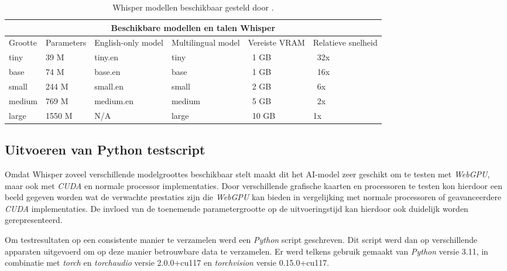 \begin{table}[b]
    \begin{tabular}{ |p{1.6cm}|p{2.5cm}|p{2.7cm}|p{2.7cm}|p{1.9cm}|p{1.8cm}|  }
        \hline
        \multicolumn{6}{|c|}{Beschikbare modellen en talen Whisper} \\
        \hline
            Grootte& Parameters & English-only model & Multilingual model & Vereiste VRAM & Relatieve snelheid\\
        \hline
            tiny&       39 M    &tiny.en    & tiny& ~1 GB& ~32x     \\
            base &      74 M	&base.en    & base & ~1 GB & ~16x   \\
            small &     244 M	&small.en   & small & ~2 GB & ~6x   \\
            medium &    769 M	&medium.en  & medium & ~5 GB & ~2x  \\
            large &     1550 M	&N/A        & large & ~10 GB& 	1x  \\
        \hline
    \end{tabular}
    \caption{Whisper modellen beschikbaar gesteld door \textcite{OpenAI2023}.}
    \label{tab:OpenAIWhisperModels}
\end{table}

\break{}

\subsection{Uitvoeren van Python testscript}

Omdat Whisper zoveel verschillende modelgroottes beschikbaar stelt maakt dit het AI-model zeer geschikt om te testen met \textit{WebGPU}, maar ook met \textit{CUDA} en normale processor implementaties. Door verschillende grafische kaarten en processoren te testen kon hierdoor een beeld gegeven worden wat de verwachte prestaties zijn die \textit{WebGPU} kan bieden in vergelijking met normale processoren of geavanceerdere \textit{CUDA} implementaties. De invloed van de toenemende parametergrootte op de uitvoeringstijd kan hierdoor ook duidelijk worden gerepresenteerd.

\bigbreak{}

Om testresultaten op een consistente manier te verzamelen werd een \textit{Python} script geschreven. Dit script werd dan op verschillende apparaten uitgevoerd om op deze manier betrouwbare data te verzamelen. Er werd telkens gebruik gemaakt van \textit{Python} versie 3.11, in combinatie met \textit{torch} en \textit{torchaudio} versie 2.0.0+cu117 en \textit{torchvision} versie 0.15.0+cu117.

